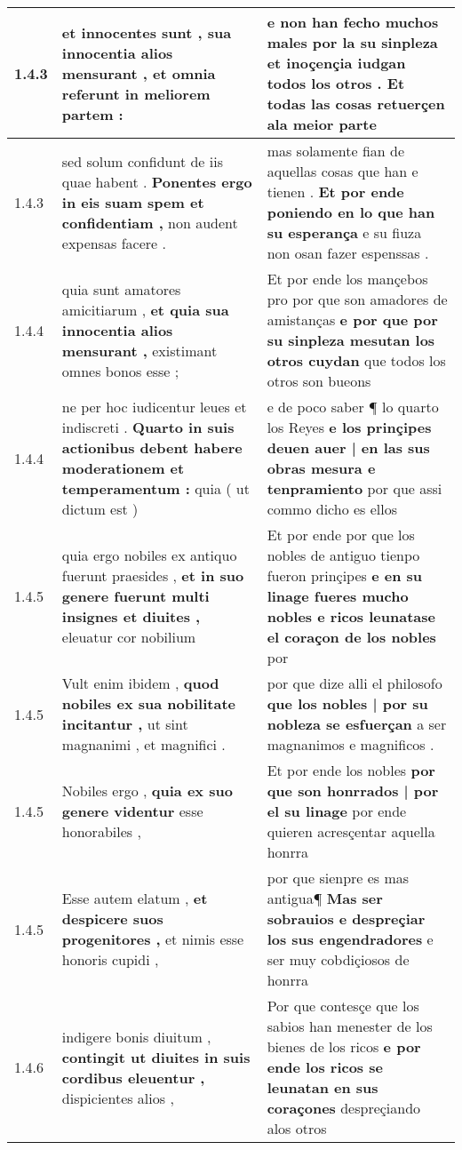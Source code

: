 \begin{tabular}{|p{1cm}|p{6.5cm}|p{6.5cm}|}
1.4.3 & et innocentes sunt , \textbf{ sua innocentia alios mensurant , } et omnia referunt in meliorem partem : & e non han fecho muchos males \textbf{ por la su sinpleza et inoçençia iudgan todos los otros . } Et todas las cosas retuerçen ala meior parte \\\hline
1.4.3 & sed solum confidunt de iis quae habent . \textbf{ Ponentes ergo in eis suam spem et confidentiam , } non audent expensas facere . & mas solamente fian de aquellas cosas que han e tienen . \textbf{ Et por ende poniendo en lo que han su esperança } e su fiuza non osan fazer espenssas . \\\hline
1.4.4 & quia sunt amatores amicitiarum , \textbf{ et quia sua innocentia alios mensurant , } existimant omnes bonos esse ; & Et por ende los mançebos pro por que son amadores de amistanças \textbf{ e por que por su sinpleza mesutan los otros cuydan } que todos los otros son bueons \\\hline
1.4.4 & ne per hoc iudicentur leues et indiscreti . \textbf{ Quarto in suis actionibus debent habere moderationem et temperamentum : } quia ( ut dictum est ) & e de poco saber ¶ lo quarto los Reyes \textbf{ e los prinçipes deuen auer | en las sus obras mesura e tenpramiento } por que assi commo dicho es ellos \\\hline
1.4.5 & quia ergo nobiles ex antiquo fuerunt praesides , \textbf{ et in suo genere fuerunt multi insignes et diuites , } eleuatur cor nobilium & Et por ende por que los nobles de antiguo tienpo fueron prinçipes \textbf{ e en su linage fueres mucho nobles e ricos leunatase el coraçon de los nobles } por \\\hline
1.4.5 & Vult enim ibidem , \textbf{ quod nobiles ex sua nobilitate incitantur , } ut sint magnanimi , et magnifici . & por que dize alli el philosofo \textbf{ que los nobles | por su nobleza se esfuerçan } a ser magnanimos e magnificos . \\\hline
1.4.5 & Nobiles ergo , \textbf{ quia ex suo genere videntur } esse honorabiles , & Et por ende los nobles \textbf{ por que son honrrados | por el su linage } por ende quieren acresçentar aquella honrra \\\hline
1.4.5 & Esse autem elatum , \textbf{ et despicere suos progenitores , } et nimis esse honoris cupidi , & por que sienpre es mas antigua¶ \textbf{ Mas ser sobrauios e despreçiar los sus engendradores } e ser muy cobdiçiosos de honrra \\\hline
1.4.6 & indigere bonis diuitum , \textbf{ contingit ut diuites in suis cordibus eleuentur , } dispicientes alios , & Por que contesçe que los sabios han menester de los bienes de los ricos \textbf{ e por ende los ricos se leunatan en sus coraçones } despreçiando alos otros \\\hline

\end{tabular}
